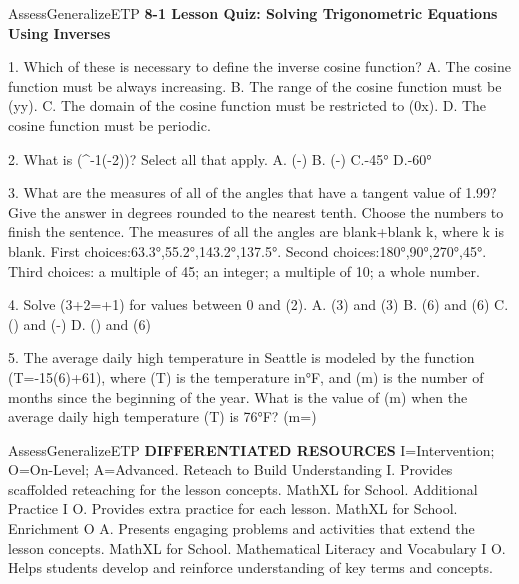 \documentclass{article}
\newenvironment{te-addendum}[2]{}{}     %
\newcommand{\answer}[1]{}               %
\newcommand{\te}[1]{}                   %
\begin{document}
\begin{te-addendum}{Assess}{GeneralizeETP}
\textbf{8-1 Lesson Quiz: Solving Trigonometric Equations Using Inverses}
\te{ASSESSMENT RESOURCES. Name blank. enVision Algebra 2. SavvasRealize.com. Copyright© Savvas Learning Company LLC. All Rights Reserved. enVision Algebra 2 Assessment Sourcebook.}
1. Which of these is necessary to define the inverse cosine function?
A. The cosine function must be always increasing.
B. The range of the cosine function must be (y\mid y).
C. The domain of the cosine function must be restricted to (0\leq x\leq\pi).
D. The cosine function must be periodic.
\answer{1.C}
2. What is (\sin^{-1}(-2))? Select all that apply.
A. (-\frac{})
B. (-\frac{})
C.-45°
D.-60°
\answer{2.A,C}
3. What are the measures of all of the angles that have a tangent value of 1.99? Give the answer in degrees rounded to the nearest tenth. Choose the numbers to finish the sentence.
The measures of all the angles are blank+blank k, where k is blank.
First choices:63.3°,55.2°,143.2°,137.5°.
Second choices:180°,90°,270°,45°.
Third choices: a multiple of 45; an integer; a multiple of 10; a whole number.
\answer{3. (63.3°+180°k), where k is an integer.}
4. Solve (3\sin\theta+2=\sin\theta+1) for values between 0 and (2\pi).
A. (\frac{2\pi}3) and (\frac{4\pi}3)
B. (\frac{7\pi}6) and (\frac{11\pi}6)
C. (\frac{}) and (-\frac{})
D. (\frac{}) and (\frac{5\pi}6)
\answer{4.B}
5. The average daily high temperature in Seattle is modeled by the function (T=-15\cos(6)+61), where (T) is the temperature in°F, and (m) is the number of months since the beginning of the year. What is the value of (m) when the average daily high temperature (T) is 76°F?
(m=)
\answer{5.6}
\end{te-addendum}
\begin{te-addendum}{Assess}{GeneralizeETP}
\textbf{DIFFERENTIATED RESOURCES}
I=Intervention; O=On-Level; A=Advanced.
Reteach to Build Understanding I. Provides scaffolded reteaching for the lesson concepts. MathXL for School.
Additional Practice I O. Provides extra practice for each lesson. MathXL for School.
Enrichment O A. Presents engaging problems and activities that extend the lesson concepts. MathXL for School.
Mathematical Literacy and Vocabulary I O. Helps students develop and reinforce understanding of key terms and concepts.
\te{Resource sheets each print Name blank, enVision Algebra 2, SavvasRealize.com, lesson title Solving Trigonometric Equations Using Inverses, Copyright© Savvas Learning Company LLC. All Rights Reserved., and enVision Algebra 2 Teaching Resources.}
\end{te-addendum}
\end{document}
